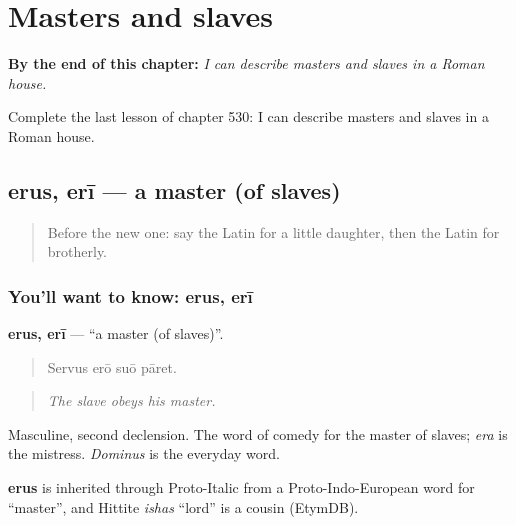 
\chapter{Masters and slaves}
\label{ch:la-masters-and-slaves}

\begin{chapteropening}
\textbf{By the end of this chapter:} \emph{I can describe masters and slaves in a Roman house.}

Complete the last lesson of chapter 530: I can describe masters and slaves in a Roman house.
\end{chapteropening}

\section[erus, erī]{erus, erī — a master (of slaves)}

\label{lesson:LA-C530-erus}



\begin{quote}
Before the new one: say the Latin for a little daughter, then the Latin for brotherly.
\end{quote}

\subsection*{You'll want to know: erus, erī}
\textbf{erus, erī} — \textquotedblleft{}a master (of slaves)\textquotedblright{}.

\begin{quote}
Servus erō suō pāret.
\end{quote}

\begin{quote}
\emph{The slave obeys his master.}
\end{quote}

Masculine, second declension. The word of comedy for the master of slaves; \emph{era} is the mistress. \emph{Dominus} is the everyday word.

\begin{cousinweb}
\textbf{erus} is inherited through Proto-Italic from a Proto-Indo-European word for \textquotedblleft{}master\textquotedblright{}, and Hittite \emph{ishas} \textquotedblleft{}lord\textquotedblright{} is a cousin (EtymDB).
\end{cousinweb}

